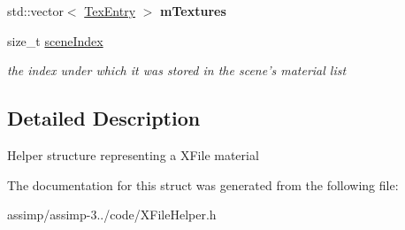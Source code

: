 \begin{DoxyCompactItemize}
\item 
\hypertarget{struct_assimp_1_1_x_file_1_1_material_a4147d01bfb186cdd2a80a8db369f5042}{std\+::vector$<$ \hyperlink{struct_assimp_1_1_x_file_1_1_tex_entry}{Tex\+Entry} $>$ {\bfseries m\+Textures}}\label{struct_assimp_1_1_x_file_1_1_material_a4147d01bfb186cdd2a80a8db369f5042}

\item 
\hypertarget{struct_assimp_1_1_x_file_1_1_material_aa2960cab14c53bf74cb097eaff8cfb4f}{size\+\_\+t \hyperlink{struct_assimp_1_1_x_file_1_1_material_aa2960cab14c53bf74cb097eaff8cfb4f}{scene\+Index}}\label{struct_assimp_1_1_x_file_1_1_material_aa2960cab14c53bf74cb097eaff8cfb4f}

\begin{DoxyCompactList}\small\item\em the index under which it was stored in the scene's material list \end{DoxyCompactList}\end{DoxyCompactItemize}


\subsection{Detailed Description}
Helper structure representing a X\+File material 

The documentation for this struct was generated from the following file\+:\begin{DoxyCompactItemize}
\item 
assimp/assimp-\/3../code/X\+File\+Helper.\+h\end{DoxyCompactItemize}
